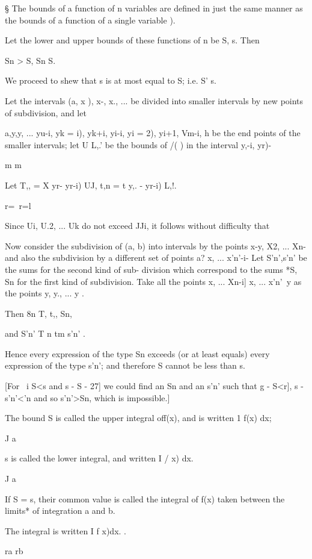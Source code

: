 § The bounds of a function of n variables are defined in just the same
manner as the bounds of a function of a single variable ).

%
%

Let the lower and upper bounds of these functions of n be S, s. Then

Sn > S, Sn S.

We proceed to shew that s is at most equal to S; i.e. S' s.

Let the intervals (a, x ), x-, x., ... be divided into smaller
intervals by new points of subdivision, and let

a,y,y, ... yu-i, yk = i), yk+i,  yi-i, yi = 2), yi+1,  Vm-i, h be
the end points of the smaller intervals; let U L,.' be the bounds of
/( ) in the interval y,-i, yr)-

m m

Let T,, = X yr- yr-i) UJ, t,n = t y,. - yr-i) L,!.

r=\ r=l

Since Ui, U.2, ... Uk do not exceed JJi, it follows without difficulty
that

Now consider the subdivision of (a, b) into intervals by the points
x-y, X2, ... Xn-\, and also the subdivision by a different set of
points a? x, ... x'n'-i- Let S'n',s'n' be the sums for the second
kind of sub- division which correspond to the sums *S, Sn for the
first kind of subdivision. Take all the points x, ... Xn-i] x, ...
x'n'\ y as the points y, y., ... y .

Then 8n T, t,, Sn,

and S'n' T n tm s'n' .

Hence every expression of the type Sn exceeds (or at least equals)
every expression of the type s'n'; and therefore S cannot be less
than s.

[For \ i S<s and s - S - 27] we could find an Sn and an s'n' such that
g - S<r], s - s'n'<'n and so s'n'>Sn, which is impossible.]

The bound S is called the upper integral off(x), and is written 1 f(x)
dx;

J a

s is called the lower integral, and written I / x) dx.

J a

If S = s, their common value is called the integral of f(x) taken
between the limits* of integration a and b.

The integral is written I f x)dx. .

ra rb


